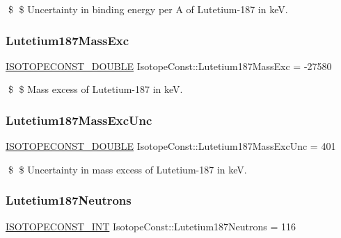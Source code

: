 \$ \$ Uncertainty in binding energy per A of Lutetium-\/187 in keV. \mbox{\label{group___isotope_const-_lutetium-_lu187_ga43fdd9238fbc6f70adc534c573bbe2ad}} 
\subsubsection{\texorpdfstring{Lutetium187\+Mass\+Exc}{Lutetium187MassExc}}
{\footnotesize\ttfamily \mbox{\hyperlink{group___isotope_const-_macros_ga8f45a7272ce02c0b4c65c44636ed719a}{I\+S\+O\+T\+O\+P\+E\+C\+O\+N\+S\+T\+\_\+\+D\+O\+U\+B\+LE}} Isotope\+Const\+::\+Lutetium187\+Mass\+Exc = -\/27580}

\$ \$ Mass excess of Lutetium-\/187 in keV. \mbox{\label{group___isotope_const-_lutetium-_lu187_ga46d4e8f44bb2288f4cf1a7f3af1999b1}} 
\subsubsection{\texorpdfstring{Lutetium187\+Mass\+Exc\+Unc}{Lutetium187MassExcUnc}}
{\footnotesize\ttfamily \mbox{\hyperlink{group___isotope_const-_macros_ga8f45a7272ce02c0b4c65c44636ed719a}{I\+S\+O\+T\+O\+P\+E\+C\+O\+N\+S\+T\+\_\+\+D\+O\+U\+B\+LE}} Isotope\+Const\+::\+Lutetium187\+Mass\+Exc\+Unc = 401}

\$ \$ Uncertainty in mass excess of Lutetium-\/187 in keV. \mbox{\label{group___isotope_const-_lutetium-_lu187_gaa7b2461f9d688051e313d51e255a5712}} 
\subsubsection{\texorpdfstring{Lutetium187\+Neutrons}{Lutetium187Neutrons}}
{\footnotesize\ttfamily \mbox{\hyperlink{group___isotope_const-_macros_ga5f18360b3e99483a35c32d789e62621c}{I\+S\+O\+T\+O\+P\+E\+C\+O\+N\+S\+T\+\_\+\+I\+NT}} Isotope\+Const\+::\+Lutetium187\+Neutrons = 116}

